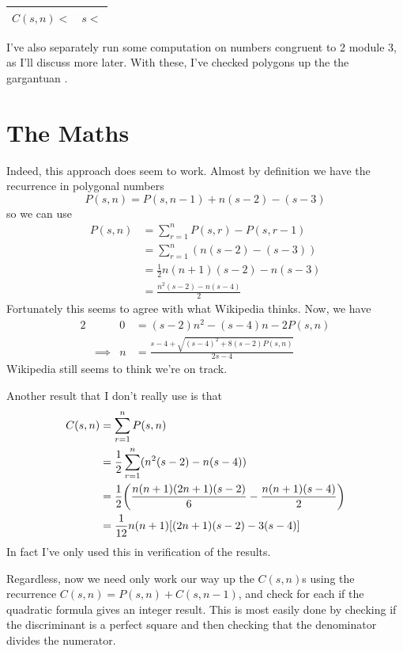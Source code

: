 \begin{longtable}{lr}
\toprule
\boldmath \(C(s, n) <\) & \boldmath \(s <\) \\
\midrule

\endhead
\bottomrule
\end{longtable}

I've also separately run some computation on numbers congruent to 2 module 3, as
I'll discuss more later. With these, I've checked polygons up the the gargantuan
.

\section{The Maths}

Indeed, this approach does seem to work. Almost by definition we have the
recurrence in polygonal numbers
\begin{equation*}
P(s, n) = P(s, n - 1) + n(s - 2) - (s - 3)
\end{equation*}
so we can use
\begin{align*}
P(s, n) &= \sum_{r = 1}^n P(s, r) - P(s, r - 1) \\
    &= \sum_{r = 1}^n (n(s - 2) - (s - 3)) \\
    &= \frac 12 n(n + 1)(s - 2) - n(s - 3) \\
    &= \frac{n^2(s - 2) - n(s - 4)} 2
\end{align*}
Fortunately this seems to agree with what Wikipedia thinks. Now, we have
\begin{alignat*}{2}
&& 0 &= (s - 2)n^2 - (s - 4)n - 2P(s, n) \\
&\implies& n &= \frac{s - 4 + \sqrt{(s - 4)^2 + 8(s - 2)P(s, n)}}{2s - 4}
\end{alignat*}
Wikipedia still seems to think we're on track.

Another result that I don't really use is that
\begin{align*}
C(s, n) &= \sum_{r = 1}^n P(s, n) \\
    &= \frac 12 \sum_{r = 1}^n (n^2(s - 2) - n(s - 4)) \\
    &= \frac 12 \pqty{\frac{n(n + 1)(2n + 1)(s - 2)} 6
                    - \frac{n(n + 1)(s - 4)} 2} \\
    &= \frac 1{12}n(n + 1)\bqty{(2n + 1)(s - 2) - 3(s - 4)}
\end{align*}
In fact I've only used this in verification of the results.

Regardless, now we need only work our way up the \(C(s, n)\)s using the
recurrence \(C(s, n) = P(s, n) + C(s, n - 1)\), and check for each if the
quadratic formula gives an integer result. This is most easily done by checking
if the discriminant is a perfect square and then checking that the denominator
divides the numerator.


